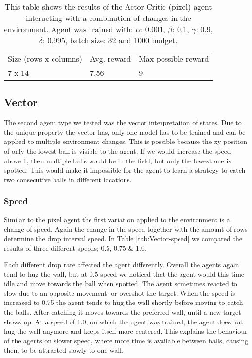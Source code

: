 \documentclass{article}
\begin{document}
    \begin{table}[]
    \begin{tabular}{lll}
    Size (rows x columns) & Avg. reward & Max possible reward \\
    7 x 14                & 7.56        & 9                  
    \end{tabular}
    \caption{This table shows the results of the Actor-Critic (pixel) agent interacting with a combination of changes in the environment. 
    Agent was trained with: $\alpha$: 0.001, $\beta$: 0.1, $\gamma$: 0.9, $\delta$: 0.995, batch size: 32 and 1000 budget. }
    \label{tab:Pixel-comb}
    \end{table}
    
    
    \subsection{Vector}
    \label{ENV-vars}
    The second agent type we tested was the vector interpretation of states.
    Due to the unique property the vector has, only one model has to be trained and can be applied to multiple environment changes.
    This is possible because the xy position of only the lowest ball is visible to the agent. 
    If we would increase the speed above 1, then multiple balls would be in the field, but only the lowest one is spotted.
    This would make it impossible for the agent to learn a strategy to catch two consecutive balls in different locations. 
    
    \subsubsection{Speed}
    Similar to the pixel agent the first variation applied to the environment is a change of speed.
    Again the change in the speed together with the amount of rows determine the drop interval speed. 
    In Table \ref{tab:Vector-speed} we compared the results of three different speeds; 0.5, 0.75 \& 1.0. 
    
    Each different drop rate affected the agent differently. 
    Overall the agents again tend to hug the wall, but at 0.5 speed we noticed that the agent would this time idle and move towards the ball when spotted.
    The agent sometimes reacted to slow due to an opposite movement, or overshot the target. 
    When the speed is increased to 0.75 the agent tends to hug the wall shortly before moving to catch the balls.
    After catching it moves towards the preferred wall, until a new target shows up.
    At a speed of 1.0, on which the agent was trained, the agent does not hug the wall anymore and keeps itself more centered.
    This explains the behaviour of the agents on slower speed, where more time is available between balls, causing them to be attracted slowly to one wall. 
    
\end{document}
